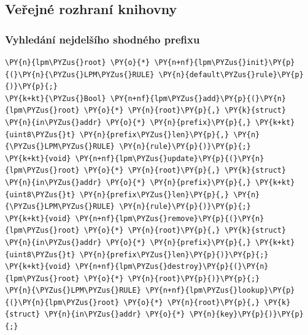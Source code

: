 \subsection{Veřejné rozhraní knihovny}

\subsubsection{Vyhledání nejdelšího shodného prefixu}

\begin{Verbatim}[commandchars=\\\{\}]
\PY{n}{lpm\PYZus{}root} \PY{o}{*} \PY{n+nf}{lpm\PYZus{}init}\PY{p}{(}\PY{n}{\PYZus{}LPM\PYZus{}RULE} \PY{n}{default\PYZus{}rule}\PY{p}{)}\PY{p}{;}
\PY{k+kt}{\PYZus{}Bool} \PY{n+nf}{lpm\PYZus{}add}\PY{p}{(}\PY{n}{lpm\PYZus{}root} \PY{o}{*} \PY{n}{root}\PY{p}{,} \PY{k}{struct} \PY{n}{in\PYZus{}addr} \PY{o}{*} \PY{n}{prefix}\PY{p}{,} \PY{k+kt}{uint8\PYZus{}t} \PY{n}{prefix\PYZus{}len}\PY{p}{,} \PY{n}{\PYZus{}LPM\PYZus{}RULE} \PY{n}{rule}\PY{p}{)}\PY{p}{;}
\PY{k+kt}{void} \PY{n+nf}{lpm\PYZus{}update}\PY{p}{(}\PY{n}{lpm\PYZus{}root} \PY{o}{*} \PY{n}{root}\PY{p}{,} \PY{k}{struct} \PY{n}{in\PYZus{}addr} \PY{o}{*} \PY{n}{prefix}\PY{p}{,} \PY{k+kt}{uint8\PYZus{}t} \PY{n}{prefix\PYZus{}len}\PY{p}{,} \PY{n}{\PYZus{}LPM\PYZus{}RULE} \PY{n}{rule}\PY{p}{)}\PY{p}{;}
\PY{k+kt}{void} \PY{n+nf}{lpm\PYZus{}remove}\PY{p}{(}\PY{n}{lpm\PYZus{}root} \PY{o}{*} \PY{n}{root}\PY{p}{,} \PY{k}{struct} \PY{n}{in\PYZus{}addr} \PY{o}{*} \PY{n}{prefix}\PY{p}{,} \PY{k+kt}{uint8\PYZus{}t} \PY{n}{prefix\PYZus{}len}\PY{p}{)}\PY{p}{;}
\PY{k+kt}{void} \PY{n+nf}{lpm\PYZus{}destroy}\PY{p}{(}\PY{n}{lpm\PYZus{}root} \PY{o}{*} \PY{n}{root}\PY{p}{)}\PY{p}{;}
\PY{n}{\PYZus{}LPM\PYZus{}RULE} \PY{n+nf}{lpm\PYZus{}lookup}\PY{p}{(}\PY{n}{lpm\PYZus{}root} \PY{o}{*} \PY{n}{root}\PY{p}{,} \PY{k}{struct} \PY{n}{in\PYZus{}addr} \PY{o}{*} \PY{n}{key}\PY{p}{)}\PY{p}{;}


\end{Verbatim}
